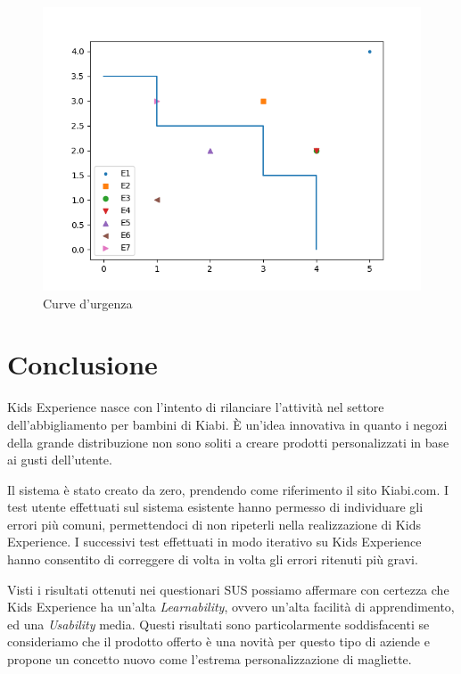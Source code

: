 \documentclass[12pt,italian,]{report}
\begin{document}
\begin{figure}[h]
\centering
\includegraphics{img/curva_urgenza.png}
\caption{Curve d'urgenza}
\end{figure}

\hypertarget{conclusione}{%
\chapter{Conclusione}\label{conclusione}}

Kids Experience nasce con l'intento di rilanciare l'attività nel settore dell'abbigliamento per bambini di Kiabi. 
È un'idea innovativa in quanto i negozi della grande distribuzione non sono soliti a creare prodotti personalizzati in base ai gusti dell'utente. 

Il sistema è stato creato da zero, prendendo come riferimento il sito Kiabi.com. 
I test utente effettuati sul sistema esistente hanno permesso di individuare gli errori più comuni, permettendoci di non ripeterli nella realizzazione di Kids Experience.
I successivi test effettuati in modo iterativo su Kids Experience hanno consentito di correggere di volta in volta gli errori ritenuti più gravi.

Visti i risultati ottenuti nei questionari SUS possiamo affermare con certezza che Kids Experience ha un'alta \emph{Learnability}, ovvero un'alta facilità di apprendimento, ed una \emph{Usability} media. Questi risultati sono particolarmente soddisfacenti se consideriamo che il prodotto offerto è una novità per questo tipo di aziende e propone un concetto nuovo come l'estrema personalizzazione di magliette.
\end{document}
